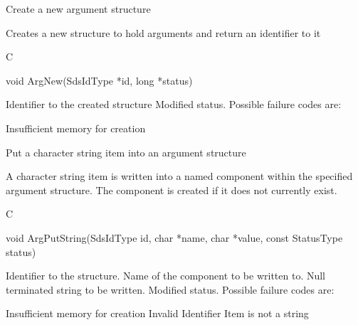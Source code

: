 \begin{manroutinedescription}
      Create a new argument structure

      Creates a new structure to hold arguments and return an
      identifier to it
 
      C

      void ArgNew(SdsIdType *id, long *status)
 
\begin{manparametertable}
 Identifier to the created %
structure
 Modified status. Possible %
failure codes are:
\end{manparametertable}
\begin{mantwocolumntable}
Insufficient memory for creation
\end{mantwocolumntable}
\end{manroutinedescription}
\begin{manroutinedescription}
      Put a character string item into an argument structure

      A character string item is written into a named component within the
      specified argument structure. The component is created if it
      does not currently exist.
 
      C

      void ArgPutString(SdsIdType id, char *name, char *value, const %
StatusType {\mantt{*}} status)
 
\begin{manparametertable}
 Identifier to the structure.
 Name of the component to be %
written to.
 Null terminated string to be %
written.
 Modified status. Possible %
failure codes are:
\end{manparametertable}
\begin{mantwocolumntable}
Insufficient memory for creation
Invalid Identifier
Item is not a string
\end{mantwocolumntable}
\end{manroutinedescription}
